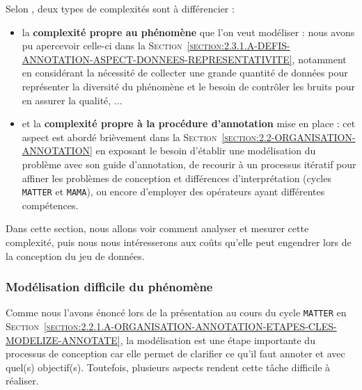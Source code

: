		Selon \cite{baledent:2022:complexite-annotation-manuelle}, deux types de complexités sont à différencier :
		\begin{itemize}
			\item la \textbf{complexité propre au phénomène} que l'on veut modéliser :
			nous avons pu apercevoir celle-ci dans la \textsc{Section~\ref{section:2.3.1.A-DEFIS-ANNOTATION-ASPECT-DONNEES-REPRESENTATIVITE}}, notamment en considérant la nécessité de collecter une grande quantité de données pour représenter la diversité du phénomène et le besoin de contrôler les bruits pour en assurer la qualité, ...
			\item et la \textbf{complexité propre à la procédure d'annotation} mise en place :
			cet aspect est abordé brièvement dans la \textsc{Section~\ref{section:2.2-ORGANISATION-ANNOTATION}} en exposant le besoin d'établir une modélisation du problème avec son guide d'annotation, de recourir à un processus itératif pour affiner les problèmes de conception et différences d'interprétation (cycles \texttt{MATTER} et \texttt{MAMA}), ou encore d'employer des opérateurs ayant différentes compétences.
		\end{itemize}
		Dans cette section, nous allons voir comment analyser et mesurer cette complexité, puis nous nous intéresserons aux coûts qu'elle peut engendrer lors de la conception du jeu de données.
		
		
		\subsubsection{Modélisation difficile du phénomène}
		\label{section:2.3.2.A-DEFIS-ANNOTATION-ASPECT-COMPLEXITE-MODELISATION}
		
			Comme nous l'avons énoncé lors de la présentation au cours du cycle \texttt{MATTER} en \textsc{Section~\ref{section:2.2.1.A-ORGANISATION-ANNOTATION-ETAPES-CLES-MODELIZE-ANNOTATE}}, la modélisation est une étape importante du processus de conception car elle permet de clarifier ce qu'il faut annoter et avec quel(s) objectif(s).
			Toutefois, plusieurs aspects rendent cette tâche difficile à réaliser.
			
